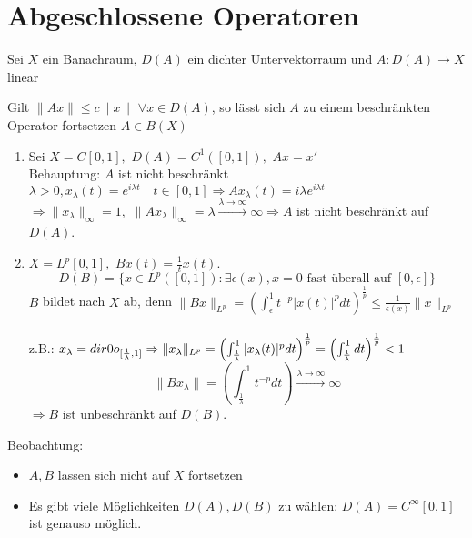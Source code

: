 
\section{Abgeschlossene Operatoren}



Sei $X$ ein Banachraum, $D(A)$ ein dichter Untervektorraum und 
$A: D(A) \rightarrow X$ linear


\begin{erinnerung}
	Gilt $\| A x \| \leq c \| x \|$ $\forall x \in D(A)$, so lässt sich $A$ zu einem beschränkten Operator fortsetzen $A \in B(X)$	
\end{erinnerung}


\begin{beispiel}
	\begin{enumerate}[label=\alph*\upshape)]
		\item Sei $X = C[0, 1],$ $D(A) = C^{1}([0, 1]),$ $Ax = x'$ \\
			Behauptung: $A$ ist nicht beschränkt \\
			$\lambda > 0, x_{\lambda}(t) = e	^{i \lambda t} \quad t \in [0, 1] \Rightarrow A x_{\lambda}(t) = i \lambda e^{i \lambda t}$ \\
			$\Rightarrow \| x_{\lambda} \|_{\infty} = 1,$ $\| A x_{\lambda} \|_{\infty} = \lambda \xrightarrow[]{\lambda \rightarrow \infty} \infty \Rightarrow A$ ist nicht beschränkt auf $D(A)$.
		\item $X = L	^{p}[0, 1],$ $B x(t) = \frac{1}{t} x(t)$.
			\[ D(B) = \{ x \in L^{p}([0, 1]): \exists \epsilon(x), x = 0 \text{ fast überall auf } [0, \epsilon] \}\]
			$B$ bildet nach $X$ ab, denn $\| B x \|_{L^{p}} = \left( \int_{\epsilon}^{1} t^{-p} |x(t)|^{p} dt \right)^{\frac{1}{p}} \leq \frac{1}{\epsilon(x)} \| x \|_{L^{p}}$ \\ \\
			z.B.: $x_{\lambda} = \1_{[\frac{1}{\lambda}, 1]} \Rightarrow \| x_{\lambda}\|_{L^{p}} = \left( \int_{\frac{1}{\lambda}}^{1} |x_{\lambda}(t)|^{p} dt \right)^{\frac{1}{p}} = \left( \int_{\frac{1}{\lambda}}^{1} dt \right)^{\frac{1}{p}} < 1$
			\[ \| B x_{\lambda} \| = \left( \int_{\frac{1}{\lambda}}^{1} t^{-p} dt \right) \xrightarrow[]{\lambda \rightarrow \infty} \infty \]
			$\Rightarrow B$ ist unbeschränkt auf $D(B)$.
	\end{enumerate}
\end{beispiel}


Beobachtung:
\begin{itemize}
	\item $A, B$ lassen sich nicht auf $X$ fortsetzen
	\item Es gibt viele Möglichkeiten $D(A), D(B)$ zu wählen; $D(A) = C^{\infty}[0, 1]$ ist genauso möglich.
\end{itemize}


